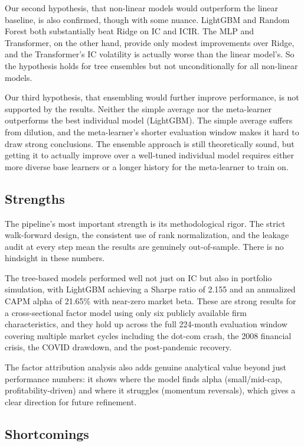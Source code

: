 \documentclass[11pt]{article}
\begin{document}
Our second hypothesis, that non-linear models would outperform the linear baseline, is also confirmed, though with some nuance. LightGBM and Random Forest both substantially beat Ridge on IC and ICIR. The MLP and Transformer, on the other hand, provide only modest improvements over Ridge, and the Transformer's IC volatility is actually worse than the linear model's. So the hypothesis holds for tree ensembles but not unconditionally for all non-linear models.

Our third hypothesis, that ensembling would further improve performance, is not supported by the results. Neither the simple average nor the meta-learner outperforms the best individual model (LightGBM). The simple average suffers from dilution, and the meta-learner's shorter evaluation window makes it hard to draw strong conclusions. The ensemble approach is still theoretically sound, but getting it to actually improve over a well-tuned individual model requires either more diverse base learners or a longer history for the meta-learner to train on.

\subsection{Strengths}

The pipeline's most important strength is its methodological rigor. The strict walk-forward design, the consistent use of rank normalization, and the leakage audit at every step mean the results are genuinely out-of-sample. There is no hindsight in these numbers.

The tree-based models performed well not just on IC but also in portfolio simulation, with LightGBM achieving a Sharpe ratio of 2.155 and an annualized CAPM alpha of 21.65\% with near-zero market beta. These are strong results for a cross-sectional factor model using only six publicly available firm characteristics, and they hold up across the full 224-month evaluation window covering multiple market cycles including the dot-com crash, the 2008 financial crisis, the COVID drawdown, and the post-pandemic recovery.

The factor attribution analysis also adds genuine analytical value beyond just performance numbers: it shows where the model finds alpha (small/mid-cap, profitability-driven) and where it struggles (momentum reversals), which gives a clear direction for future refinement.

\subsection{Shortcomings}
\end{document}
